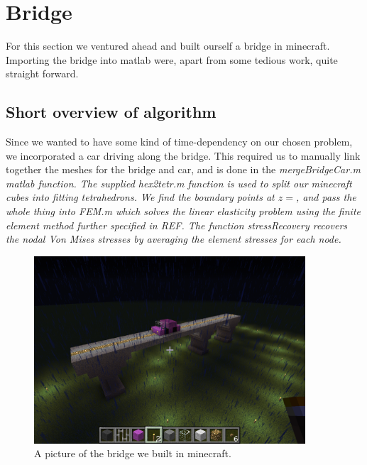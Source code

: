 \section{Bridge}

For this section we ventured ahead and built ourself a bridge in minecraft. Importing the bridge into matlab were, apart from some tedious work, quite straight forward.

\subsection{Short overview of algorithm}
Since we wanted to have some kind of time-dependency on our chosen problem, we incorporated a car driving along the bridge. This required us to manually link together the meshes for the bridge and car, and is done in the \it{mergeBridgeCar.m} matlab function. The supplied \it{hex2tetr.m} function is used to split our minecraft cubes into fitting tetrahedrons. We find the boundary points at $z = $, and pass the whole thing into \it{FEM.m} which solves the linear elasticity problem using the finite element method further specified in REF. The function \it{stressRecovery} recovers the nodal Von Mises stresses by averaging the element stresses for each node.



\begin{figure}
\center
\includegraphics[trim=0cm 5cm 7cm 7cm, clip=true, width=0.9\textwidth]{pic_bridge}
\caption{A picture of the bridge we built in minecraft.}
\label{fig:picBridge}
\end{figure}